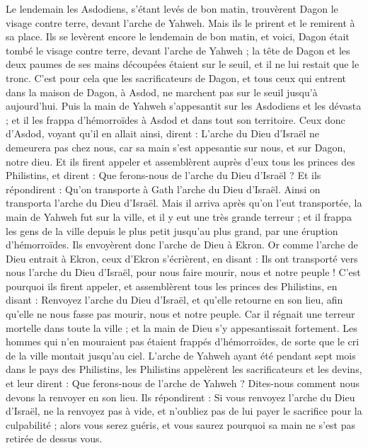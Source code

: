 \begin{multicols}{2}
Le lendemain les Asdodiens, s'étant levés de bon matin, trouvèrent Dagon le visage contre terre, devant l'arche de Yahweh. Mais ils le prirent et le remirent à sa place.
Ils se levèrent encore le lendemain de bon matin, et voici, Dagon était tombé le visage contre terre, devant l'arche de Yahweh ; la tête de Dagon et les deux paumes de ses mains découpées étaient sur le seuil, et il ne lui restait que le tronc.
C'est pour cela que les sacrificateurs de Dagon, et tous ceux qui entrent dans la maison de Dagon, à Asdod, ne marchent pas sur le seuil jusqu'à aujourd'hui.
Puis la main de Yahweh s'appesantit sur les Asdodiens et les dévasta ; et il les frappa d'hémorroïdes à Asdod et dans tout son territoire.
Ceux donc d'Asdod, voyant qu'il en allait ainsi, dirent : L'arche du Dieu d'Israël ne demeurera pas chez nous, car sa main s'est appesantie sur nous, et sur Dagon, notre dieu.
Et ils firent appeler et assemblèrent auprès d'eux tous les princes des Philistins, et dirent : Que ferons-nous de l'arche du Dieu d'Israël ? Et ils répondirent : Qu'on transporte à Gath l'arche du Dieu d'Israël. Ainsi on transporta l'arche du Dieu d'Israël.
Mais il arriva après qu'on l'eut transportée, la main de Yahweh fut sur la ville, et il y eut une très grande terreur ; et il frappa les gens de la ville depuis le plus petit jusqu'au plus grand, par une éruption d'hémorroïdes.
Ils envoyèrent donc l'arche de Dieu à Ekron. Or comme l'arche de Dieu entrait à Ekron, ceux d'Ekron s'écrièrent, en disant : Ils ont transporté vers nous l'arche du Dieu d'Israël, pour nous faire mourir, nous et notre peuple !
C'est pourquoi ils firent appeler, et assemblèrent tous les princes des Philistins, en disant : Renvoyez l'arche du Dieu d'Israël, et qu'elle retourne en son lieu, afin qu'elle ne nous fasse pas mourir, nous et notre peuple. Car il régnait une terreur mortelle dans toute la ville ; et la main de Dieu s'y appesantissait fortement.
Les hommes qui n'en mouraient pas étaient frappés d'hémorroïdes, de sorte que le cri de la ville montait jusqu'au ciel.
\VerseOne{}L'arche de Yahweh ayant été pendant sept mois dans le pays des Philistins,
les Philistins appelèrent les sacrificateurs et les devins, et leur dirent : Que ferons-nous de l'arche de Yahweh ? Dites-nous comment nous devons la renvoyer en son lieu.
Ils répondirent : Si vous renvoyez l'arche du Dieu d'Israël, ne la renvoyez pas à vide, et n'oubliez pas de lui payer le sacrifice pour la culpabilité ; alors vous serez guéris, et vous saurez pourquoi sa main ne s'est pas retirée de dessus vous.

\end{multicols}

